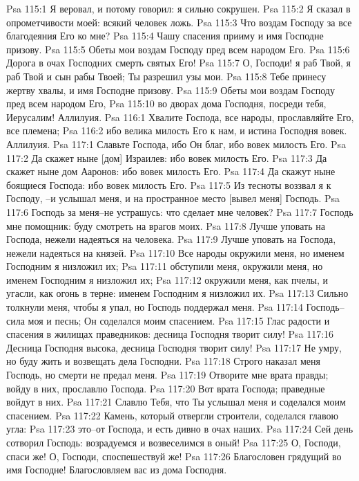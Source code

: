 Psa 115:1  Я веровал, и потому говорил: я сильно сокрушен.
Psa 115:2  Я сказал в опрометчивости моей: всякий человек ложь.
Psa 115:3  Что воздам Господу за все благодеяния Его ко мне?
Psa 115:4  Чашу спасения прииму и имя Господне призову.
Psa 115:5  Обеты мои воздам Господу пред всем народом Его.
Psa 115:6  Дорога в очах Господних смерть святых Его!
Psa 115:7  О, Господи! я раб Твой, я раб Твой и сын рабы Твоей; Ты разрешил узы мои.
Psa 115:8  Тебе принесу жертву хвалы, и имя Господне призову.
Psa 115:9  Обеты мои воздам Господу пред всем народом Его,
Psa 115:10  во дворах дома Господня, посреди тебя, Иерусалим! Аллилуия.
Psa 116:1  Хвалите Господа, все народы, прославляйте Его, все племена;
Psa 116:2  ибо велика милость Его к нам, и истина Господня вовек. Аллилуия.
Psa 117:1  Славьте Господа, ибо Он благ, ибо вовек милость Его.
Psa 117:2  Да скажет ныне [дом] Израилев: ибо вовек милость Его.
Psa 117:3  Да скажет ныне дом Ааронов: ибо вовек милость Его.
Psa 117:4  Да скажут ныне боящиеся Господа: ибо вовек милость Его.
Psa 117:5  Из тесноты воззвал я к Господу, --и услышал меня, и на пространное место [вывел меня] Господь.
Psa 117:6  Господь за меня--не устрашусь: что сделает мне человек?
Psa 117:7  Господь мне помощник: буду смотреть на врагов моих.
Psa 117:8  Лучше уповать на Господа, нежели надеяться на человека.
Psa 117:9  Лучше уповать на Господа, нежели надеяться на князей.
Psa 117:10  Все народы окружили меня, но именем Господним я низложил их;
Psa 117:11  обступили меня, окружили меня, но именем Господним я низложил их;
Psa 117:12  окружили меня, как пчелы, и угасли, как огонь в терне: именем Господним я низложил их.
Psa 117:13  Сильно толкнули меня, чтобы я упал, но Господь поддержал меня.
Psa 117:14  Господь--сила моя и песнь; Он соделался моим спасением.
Psa 117:15  Глас радости и спасения в жилищах праведников: десница Господня творит силу!
Psa 117:16  Десница Господня высока, десница Господня творит силу!
Psa 117:17  Не умру, но буду жить и возвещать дела Господни.
Psa 117:18  Строго наказал меня Господь, но смерти не предал меня.
Psa 117:19  Отворите мне врата правды; войду в них, прославлю Господа.
Psa 117:20  Вот врата Господа; праведные войдут в них.
Psa 117:21  Славлю Тебя, что Ты услышал меня и соделался моим спасением.
Psa 117:22  Камень, который отвергли строители, соделался главою угла:
Psa 117:23  это--от Господа, и есть дивно в очах наших.
Psa 117:24  Сей день сотворил Господь: возрадуемся и возвеселимся в оный!
Psa 117:25  О, Господи, спаси же! О, Господи, споспешествуй же!
Psa 117:26  Благословен грядущий во имя Господне! Благословляем вас из дома Господня.
